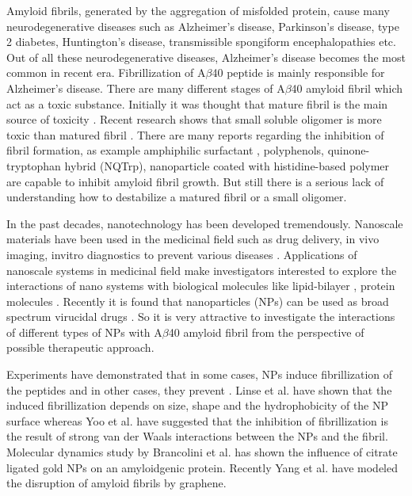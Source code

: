 \documentclass[journal=jacsat,manuscript=communication]{achemso}
\begin{document}
Amyloid fibrils, generated by the aggregation of misfolded protein, cause many
neurodegenerative diseases such as Alzheimer's disease, Parkinson's disease,
type 2 diabetes, Huntington's disease, transmissible spongiform encephalopathies
etc\cite{Chiti2006}. Out of all these neurodegenerative diseases, Alzheimer's
disease becomes the most common in recent era\cite{..}.  Fibrillization of
A$\beta$40 peptide \cite{Hardy2002, Selkoe2004} is mainly responsible for
Alzheimer's disease. There are many different stages of A$\beta$40 amyloid
fibril which act as a toxic substance. Initially it was thought that mature
fibril is the main source of toxicity \cite{Hardy2002}.  Recent research shows
that small soluble oligomer is more toxic than matured fibril \cite{Haass2007}.
There are many reports regarding the inhibition of fibril formation, as example
amphiphilic surfactant \cite{Steven2005}, polyphenols\cite{Porat2006},
quinone-tryptophan hybrid (NQTrp)\cite{Attali2010}, nanoparticle coated with
histidine-based polymer\cite{Palmal2014} are capable to inhibit amyloid fibril
growth. But still there is a serious lack of understanding how to destabilize a
matured fibril or a small oligomer.

In the past decades, nanotechnology has been developed tremendously.  Nanoscale
materials have been used in the medicinal field such as drug delivery, in vivo
imaging, invitro diagnostics to prevent various diseases
\cite{Bianco2005,Lademann2007,Igor2005, Paul2004,Pearson2016}. Applications of
nanoscale systems in medicinal field make investigators interested to explore
the interactions of nano systems with biological molecules like lipid-bilayer
\cite{Hao2014,Lu2014}, protein molecules \cite{Shemetov2012,Nel2009}.  Recently
it is found that nanoparticles (NPs)  can be used as broad spectrum virucidal
drugs \cite{Francesco}. So it is very attractive to investigate the interactions
of different types of NPs with A$\beta$40 amyloid fibril from the perspective of
possible therapeutic approach.

Experiments have demonstrated that in some cases, NPs induce fibrillization of
the peptides \cite{Linse2007,Anika2016} and in other cases, they prevent
\cite{Celia2008,Yoo2011}. Linse et al.\cite{Linse2007} have shown that the
induced fibrillization depends on size, shape and the hydrophobicity of the NP
surface whereas Yoo et al. \cite{Yoo2011} have suggested that the inhibition of
fibrillization is the result of strong van der Waals interactions between the
NPs and the fibril.  Molecular dynamics study by Brancolini et al.
\cite{Brancolini2015} has shown the influence of citrate ligated gold NPs on an
amyloidgenic protein. Recently Yang et al. \cite{Yang2015} have modeled the
disruption of amyloid fibrils by graphene.   
\end{document}

